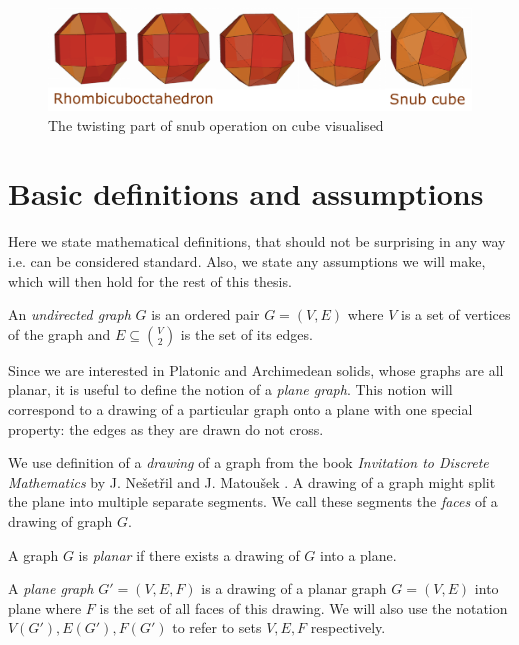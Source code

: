 \begin{description}
\begin{figure}[H]
    \centering
    \includegraphics[width=1\textwidth]{Resources/Figs/op_snub.pdf}
    \caption{The twisting part of snub operation on cube visualised \cite{natal-polyhed-viewer}}
    \label{fig:op_snub}
\end{figure}
    
\end{description}

\section{Basic definitions and assumptions}

Here we state mathematical definitions, that should not be surprising in any way i.e. can be considered standard. Also, we state any assumptions we will make, which will then hold for the rest of this thesis.

\begin{defn}
    An \emph{undirected graph} $G$ is an ordered pair $G=(V,E)$ where $V$ is a set of vertices of the graph and $E \subseteq \binom{V}{2}$ is the set of its edges. 
\end{defn}

Since we are interested in Platonic and Archimedean solids, whose graphs are all planar, it is useful to define the notion of a \textit{plane graph}. This notion will correspond to a drawing of a particular graph onto a plane with one special property: the edges as they are drawn do not cross. 

We use definition of a \textit{drawing} of a graph from the book \textit{Invitation to Discrete Mathematics} by J. Nešetřil and J. Matoušek \cite{matousek2009}. A drawing of a graph might split the plane into multiple separate segments. We call these segments the \textit{faces} of a drawing of graph $G$.

\begin{defn}
    A graph $G$ is \emph{planar} if there exists a drawing of $G$ into a plane.
\end{defn}

\begin{defn}
    A \emph{plane graph} $G' = (V,E,F)$ is a drawing of a planar graph $G=(V,E)$ into plane where $F$ is the set of all faces of this drawing. We will also use the notation $V(G'), E(G'), F(G')$ to refer to sets $V,E,F$ respectively.
\end{defn}

